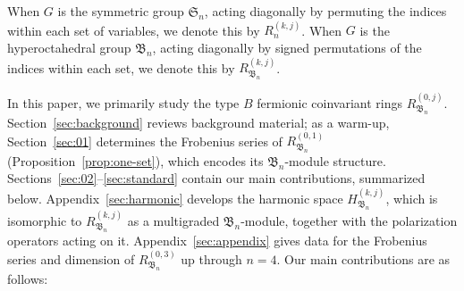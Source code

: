 \documentclass[12pt]{amsart}
\theoremstyle{plain}
\theoremstyle{definition}
\begin{document}
When $G$ is the symmetric group $\mathfrak{S}_n$, acting diagonally by permuting the indices within each set of variables, we denote this by $R_n^{(k,j)}$.
When $G$ is the hyperoctahedral group $\mathfrak{B}_n$, acting diagonally by signed permutations of the indices within each set, we denote this by $R_{\mathfrak{B}_n}^{(k,j)}$.

In this paper, we primarily study the type $B$ fermionic coinvariant rings $R_{\mathfrak{B}_n}^{(0,j)}$.
Section~\ref{sec:background} reviews background material; as a warm-up, Section~\ref{sec:01} determines the Frobenius series of $R_{\mathfrak{B}_n}^{(0,1)}$ (Proposition~\ref{prop:one-set}), which encodes its $\mathfrak{B}_n$-module structure.
Sections~\ref{sec:02}--\ref{sec:standard} contain our main contributions, summarized below. 
Appendix~\ref{sec:harmonic} develops the harmonic space $H_{\mathfrak{B}_n}^{(k,j)}$, which is isomorphic to $R_{\mathfrak{B}_n}^{(k,j)}$ as a multigraded $\mathfrak{B}_n$-module, together with the polarization operators acting on it. 
Appendix~\ref{sec:appendix} gives data for the Frobenius series and dimension of $R_{\mathfrak{B}_n}^{(0,3)}$ up through $n=4$.
Our main contributions are as follows:
\end{document}
